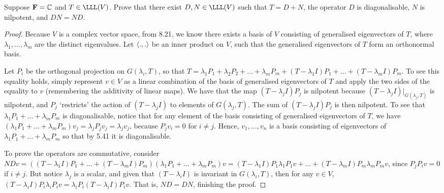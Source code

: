 \begin{exercise}{10}
  Suppose $\mathbf{F}=\mathbb{C}$ and $T\in\LLL(V)$. Prove that there exist $D,N\in\LLL(V)$ such that $T=D+N$, the operator $D$ is diagonalisable, $N$ is nilpotent, and $DN=ND$.
\end{exercise}
\begin{proof}
 Because $V$ is a complex vector space, from 8.21, we know there exists a basis of $V$ consisting of generalised eigenvectors of $T$, where $\lambda_1,\dots,\lambda_m$ are the distinct eigenvalues. Let $\langle .,.\rangle$ be an inner product on $V$, such that the generalised eigenvectors of $T$ form an orthonormal basis. 

 Let $P_i$ be the orthogonal projection on $G(\lambda_i,T)$, so that $T=\lambda_1P_1+\lambda_2P_2+\dots+\lambda_mP_m+(T-\lambda_1 I)P_1+\dots+(T-\lambda_m I)P_m$. To see this equality holds, simply represent $v\in V$ as a linear combination of the basis of generalised eigenvectors of $T$ and apply the two sides of the equality to $v$ (remembering the additivity of linear maps). We have that the map $(T-\lambda_j I)P_j$ is nilpotent because $(T-\lambda_j I)|_{G(\lambda_j,T)}$ is nilpotent, and $P_j$ `restricts' the action of $(T-\lambda_j I)$ to elements of $G(\lambda_j,T)$. The sum of $(T-\lambda_j I)P_j$ is then nilpotent. To see that $\lambda_1 P_1+\dots+\lambda_m P_m$ is diagonalisable, notice that for any element of the basis consisting of generalised eigenvectors of $T$, we have $(\lambda_1P_1+\dots+\lambda_mP_m)v_j = \lambda_jP_jv_j = \lambda_j v_j$, because $P_jv_i=0$ for $i\neq j$. Hence, $v_1,\dots,v_n$ is a basis consisting of eigenvectors of $\lambda_1P_1+\dots+\lambda_mP_m$ so that by 5.41 it is diagonalisable.

 To prove the operators are commutative, consider $NDv =((T-\lambda_1 I)P_1+\dots+(T-\lambda_m I)P_m)(\lambda_1P_1+\dots+\lambda_mP_m)v = (T-\lambda_1 I)P_1\lambda_1P_1v+\dots+(T-\lambda_m I)P_m\lambda_mP_mv$, since $P_jP_iv=0$ if $i\neq j$. But notice $\lambda_j$ is a scalar, and given that $(T-\lambda_i I)$ is invariant in $G(\lambda_i,T)$, then for any $v\in V$,  $(T-\lambda_i I)P_i\lambda_iP_iv =\lambda_iP_i(T-\lambda_i I)P_iv$. That is, $ND=DN$, finishing the proof.
\end{proof}